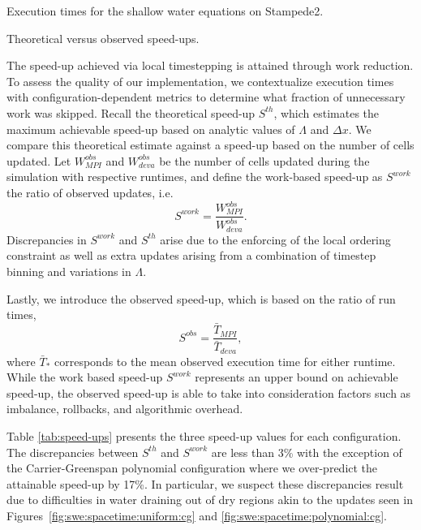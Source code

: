 \begin{table}
{\footnotesize
\caption{Execution times for the shallow water equations on Stampede2.}
\label{tab:performance-data}
  \centering

}
\end{table}


\begin{table}
{\footnotesize
\caption{Theoretical versus observed speed-ups.}
\label{tab:speed-ups}
  \centering

}
\end{table}
The speed-up achieved via local timestepping is attained through work reduction. 
To assess the quality of our implementation, we contextualize execution times with configuration-dependent metrics to determine what fraction of unnecessary work was skipped. 
Recall the theoretical speed-up $S^{th}$, which estimates the maximum achievable speed-up based on analytic values of $\Lambda$ and $\Delta x$. We compare this theoretical estimate against a speed-up based on the number of cells updated.
 Let $W^{obs}_{MPI}$ and $W^{obs}_{deva}$ be the number of cells updated during the simulation with respective runtimes, and define the work-based speed-up as $S^{work}$ the ratio of observed updates, i.e.
\begin{equation*}
S^{work} = \frac{W^{obs}_{MPI}}{W^{obs}_{deva}}.
\end{equation*}
Discrepancies in $S^{work}$ and $S^{th}$ arise due to the enforcing of the local ordering constraint as well as extra updates arising from a combination of timestep binning and variations in $\Lambda$.

Lastly, we introduce the observed speed-up, which is based on the ratio of run times,
\begin{equation*}
S^{obs} = \frac{ \bar{T}_{MPI} }{\bar{T}_{deva}},
\end{equation*} 
where $\bar{T}_*$ corresponds to the mean observed execution time for either runtime. While the work based speed-up $S^{work}$ represents an upper bound on achievable speed-up, the observed speed-up is able to take into consideration factors such as imbalance, rollbacks, and algorithmic overhead.

Table \ref{tab:speed-ups} presents the three speed-up values for each configuration. The discrepancies between $S^{th}$ and $S^{work}$ are less than 3\% with the exception of the Carrier-Greenspan polynomial configuration where we over-predict the attainable speed-up by 17\%. In particular, we suspect these discrepancies result due to difficulties in water draining out of dry regions akin to the updates seen in Figures~\ref{fig:swe:spacetime:uniform:cg} and \ref{fig:swe:spacetime:polynomial:cg}.


